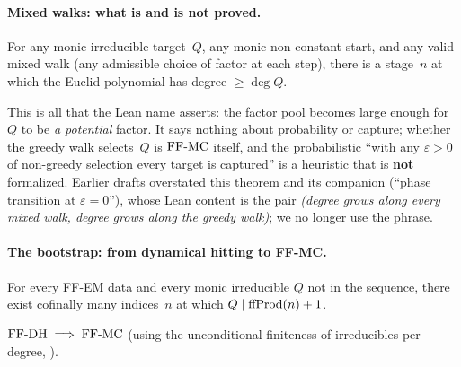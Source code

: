\paragraph{Mixed walks: what is and is not proved.}

\begin{theorem}
\label{thm:ff-stoch}
For any monic irreducible target~$Q$, any monic non-constant start, and
any valid mixed walk (any admissible choice of factor at each step),
there is a stage~$n$ at which the Euclid polynomial has degree
$\geq \deg Q$.
\end{theorem}
\noindent This is all that the Lean name  asserts:
the factor pool becomes large enough for $Q$ to be \emph{a potential}
factor.  It says nothing about probability or capture; whether the
greedy walk selects~$Q$ is $\mathrm{FF\text{-}MC}$ itself, and the probabilistic
``with any $\varepsilon > 0$ of non-greedy selection every target is
captured'' is a heuristic that is \textbf{not} formalized.  Earlier
drafts overstated this theorem and its companion
(``phase transition at $\varepsilon = 0$''), whose Lean content is the
pair \emph{(degree grows along every mixed walk, degree grows along the
greedy walk)}; we no longer use the phrase.
\label{thm:ff-phase}

\paragraph{The bootstrap: from dynamical hitting to FF-MC.}

\begin{property}
\label{prop:ffdh}
For every FF-EM data and every monic irreducible $Q$ not in the
sequence, there exist cofinally many indices~$n$ at which
$Q \mid \mathrm{ffProd}(n)+1$.
\end{property}

\begin{theorem}
\label{thm:ff-bootstrap}
$\mathrm{FF\text{-}DH} \;\Longrightarrow\; \mathrm{FF\text{-}MC}$ (using the unconditional finiteness of
irreducibles per degree,
).
\end{theorem}

